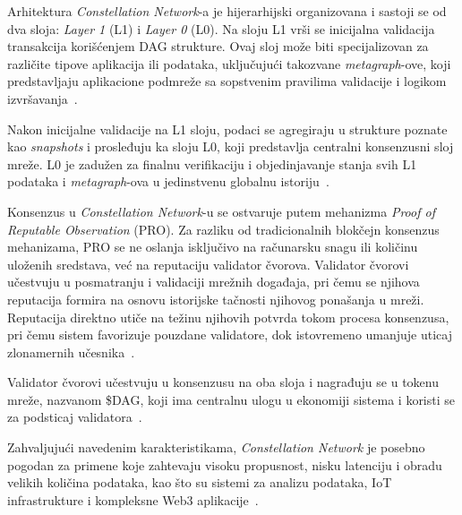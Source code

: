 Arhitektura \textit{Constellation Network}-a je hijerarhijski organizovana i sastoji se od dva sloja: \textit{Layer 1} (L1) i \textit{Layer 0} (L0). Na sloju L1 vrši se inicijalna validacija transakcija korišćenjem DAG strukture. Ovaj sloj može biti specijalizovan za različite tipove aplikacija ili podataka, uključujući takozvane \textit{metagraph}-ove, koji predstavljaju aplikacione podmreže sa sopstvenim pravilima validacije i logikom izvršavanja~\cite{constellation whitepaper}.

Nakon inicijalne validacije na L1 sloju, podaci se agregiraju u strukture poznate kao \textit{snapshots} i prosleđuju ka sloju L0, koji predstavlja centralni konsenzusni sloj mreže. L0 je zadužen za finalnu verifikaciju i objedinjavanje stanja svih L1 podataka i \textit{metagraph}-ova u jedinstvenu globalnu istoriju~\cite{constellation whitepaper}.

Konsenzus u \textit{Constellation Network}-u se ostvaruje putem mehanizma \textit{Proof of Reputable Observation} (PRO). Za razliku od tradicionalnih blokčejn konsenzus mehanizama, PRO se ne oslanja isključivo na računarsku snagu ili količinu uloženih sredstava, već na reputaciju validator čvorova. Validator čvorovi učestvuju u posmatranju i validaciji mrežnih događaja, pri čemu se njihova reputacija formira na osnovu istorijske tačnosti njihovog ponašanja u mreži. Reputacija direktno utiče na težinu njihovih potvrda tokom procesa konsenzusa, pri čemu sistem favorizuje pouzdane validatore, dok istovremeno umanjuje uticaj zlonamernih učesnika~\cite{constellation whitepaper,crypto PRO constellation}.

Validator čvorovi učestvuju u konsenzusu na oba sloja i nagrađuju se u tokenu mreže, nazvanom \$DAG, koji ima centralnu ulogu u ekonomiji sistema i koristi se za podsticaj validatora~\cite{constellation docs}.

Zahvaljujući navedenim karakteristikama, \textit{Constellation Network} je posebno pogodan za primene koje zahtevaju visoku propusnost, nisku latenciju i obradu velikih količina podataka, kao što su sistemi za analizu podataka, IoT infrastrukture i kompleksne Web3 aplikacije~\cite{constellation whitepaper}.